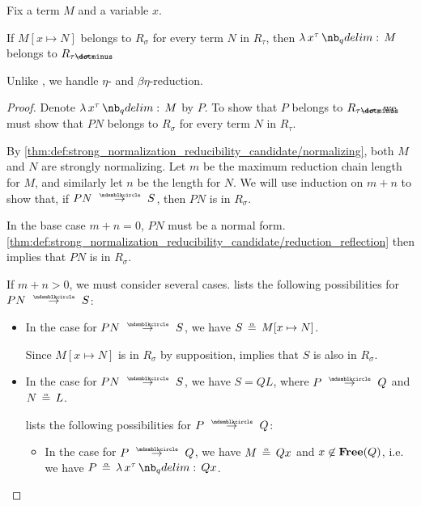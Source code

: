 \begin{lemma}\label{thm:reducibility_candidate_abstraction}
  Fix a term \( M \) and a variable \( x \).

  If \( M[x \mapsto N] \) belongs to \( R_\sigma \) for every term \( N \) in \( R_\tau \), then \( \qabs {x^\tau} M \) belongs to \( R_{\tau \synimplies \sigma} \).
\end{lemma}
\begin{comments}
  \item Unlike , we handle \( \eta \)- and \( \beta\eta \)-reduction.
\end{comments}
\begin{proof}
  Denote \( \qabs {x^\tau} M \) by \( P \). To show that \( P \) belongs to \( R_{\tau \synimplies \sigma} \), we must show that \( P N \) belongs to \( R_\sigma \) for every term \( N \) in \( R_\tau \).

  By \ref{thm:def:strong_normalization_reducibility_candidate/normalizing}, both \( M \) and \( N \) are strongly normalizing. Let \( m \) be the maximum reduction chain length for \( M \), and similarly let \( n \) be the length for \( N \). We will use induction on \( m + n \) to show that, if \( P N \pred S \), then \( P N \) is in \( R_\sigma \).

  In the base case \( m + n = 0 \), \( P N \) must be a normal form. \ref{thm:def:strong_normalization_reducibility_candidate/reduction_reflection} then implies that \( P N \) is in \( R_\sigma \).

  If \( m + n > 0 \), we must consider several cases.  lists the following possibilities for \( P N \pred S \):
  \begin{itemize}
    \item In the case  for \( P N \pred S \), we have \( S \aequiv M[x \mapsto N] \).

    Since \( M[x \mapsto N] \) is in \( R_\sigma \) by supposition,  implies that \( S \) is also in \( R_\sigma \).

    \item In the case  for \( P N \pred S \), we have \( S = Q L \), where \( P \pred Q \) and \( N \aequiv L \).

     lists the following possibilities for \( P \pred Q \):
    \begin{itemize}
      \item In the case  for \( P \pred Q \), we have \( M \aequiv Qx \) and \( x \not\in \op*{Free}(Q) \), i.e. we have \( P \aequiv \qabs {x^\tau} Qx \).


\end{itemize}
\end{itemize}
\end{proof}
